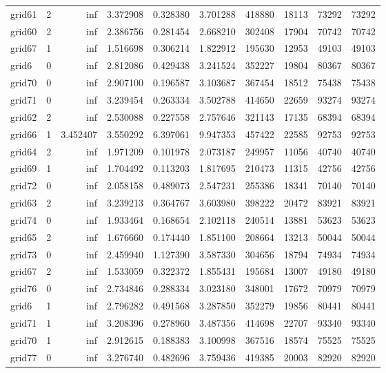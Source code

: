 \begin{longtable}{|l|r|r|r|r|r|r|r|r|r|}
grid61 & 2 & inf & 3.372908 & 0.328380 & 3.701288 & 418880 & 18113 & 73292 & 73292 \\
grid60 & 2 & inf & 2.386756 & 0.281454 & 2.668210 & 302408 & 17904 & 70742 & 70742 \\
grid67 & 1 & inf & 1.516698 & 0.306214 & 1.822912 & 195630 & 12953 & 49103 & 49103 \\
grid6 & 0 & inf & 2.812086 & 0.429438 & 3.241524 & 352227 & 19804 & 80367 & 80367 \\
grid70 & 0 & inf & 2.907100 & 0.196587 & 3.103687 & 367454 & 18512 & 75438 & 75438 \\
grid71 & 0 & inf & 3.239454 & 0.263334 & 3.502788 & 414650 & 22659 & 93274 & 93274 \\
grid62 & 2 & inf & 2.530088 & 0.227558 & 2.757646 & 321143 & 17135 & 68394 & 68394 \\
grid66 & 1 & 3.452407 & 3.550292 & 6.397061 & 9.947353 & 457422 & 22585 & 92753 & 92753 \\
grid64 & 2 & inf & 1.971209 & 0.101978 & 2.073187 & 249957 & 11056 & 40740 & 40740 \\
grid69 & 1 & inf & 1.704492 & 0.113203 & 1.817695 & 210473 & 11315 & 42756 & 42756 \\
grid72 & 0 & inf & 2.058158 & 0.489073 & 2.547231 & 255386 & 18341 & 70140 & 70140 \\
grid63 & 2 & inf & 3.239213 & 0.364767 & 3.603980 & 398222 & 20472 & 83921 & 83921 \\
grid74 & 0 & inf & 1.933464 & 0.168654 & 2.102118 & 240514 & 13881 & 53623 & 53623 \\
grid65 & 2 & inf & 1.676660 & 0.174440 & 1.851100 & 208664 & 13213 & 50044 & 50044 \\
grid73 & 0 & inf & 2.459940 & 1.127390 & 3.587330 & 304656 & 18794 & 74934 & 74934 \\
grid67 & 2 & inf & 1.533059 & 0.322372 & 1.855431 & 195684 & 13007 & 49180 & 49180 \\
grid76 & 0 & inf & 2.734846 & 0.288334 & 3.023180 & 348001 & 17672 & 70979 & 70979 \\
grid6 & 1 & inf & 2.796282 & 0.491568 & 3.287850 & 352279 & 19856 & 80441 & 80441 \\
grid71 & 1 & inf & 3.208396 & 0.278960 & 3.487356 & 414698 & 22707 & 93340 & 93340 \\
grid70 & 1 & inf & 2.912615 & 0.188383 & 3.100998 & 367516 & 18574 & 75525 & 75525 \\
grid77 & 0 & inf & 3.276740 & 0.482696 & 3.759436 & 419385 & 20003 & 82920 & 82920 \\

\end{longtable}
